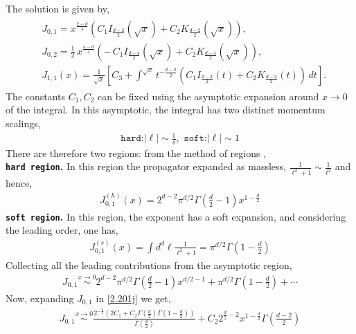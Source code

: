 The solution is given by,
\begin{align}
\begin{split}
&    J_{0,1}=x^{\frac{2-d}{4}}\left(C_1 I_{\frac{d-2}{2}}(\sqrt{x})+C_2 K_{\frac{d-2}{2}}(\sqrt{x})\right),\\ &
J_{0,2}
=
\frac{1}{2}\,x^{\frac{4-d}{4}}
\left(
-\,C_1 I_{\frac{d-4}{2}}(\sqrt{x})
+
C_2 K_{\frac{d-4}{2}}(\sqrt{x})
\right),\\ &
J_{1,1}(x)
=
\frac{1}{\sqrt{x}}
\left[
C_3
+
\int^{\sqrt{x}}
t^{-\frac{d-2}{2}}
\left(
C_1 I_{\frac{d-2}{2}}(t)
+
C_2 K_{\frac{d-2}{2}}(t)
\right)\,dt
\right].\label{2.201j}
    \end{split}
\end{align}
The constants $C_1, C_2$ can be fixed using the asymptotic expansion around $x\to 0$ of the integral. In this asymptotic, the integral has two distinct momentum scalings,
\begin{align}
   \texttt{hard:} |\boldsymbol{\ell}|\sim\frac{1}{s},\,\,  \texttt{soft:} |\boldsymbol{\ell}|\sim1
\end{align}
There are therefore two regions: from the method of regions \cite{Beneke:1997zp},\\
\textbf{\texttt{hard region}.} In this region the propagator expanded as massless, $\frac{1}{\boldsymbol{\ell}^2+1}\sim \frac{1}{\boldsymbol{\ell}^2}$ and hence,
\begin{align}
    J_{0,1}^{(h)}(x)=2^{d-2}\pi^{d/2} \Gamma\left(\frac{d}{2}-1\right)x^{1-\frac{d}{2}}
\end{align}
\textbf{\texttt{soft region}.} In this region, the exponent has a soft expansion, and considering the leading order, one has,
\begin{align}
    J_{0,1}^{(s)}(x)=\int d^d\boldsymbol{\ell} \frac{1}{\boldsymbol{\ell}^2+1}=\pi^{d/2}\Gamma\left(1-\frac{d}{2}\right)
\end{align}
Collecting all the leading contributions from the asymptotic region,
\begin{align}
    J_{0,1}\overset{x\to 0}{\sim} 2^{d-2}\pi^{d/2}\Gamma\left(\frac{d}{2}-1\right) x^{d/2-1}+\pi^{d/2}\Gamma\left(1-\frac{d}{2}\right)+\cdots\label{2.205a}
\end{align}
Now, expanding $J_{0,1}$ in \eqref{2.201j} we get,
\begin{align}
   J_{0,1}\overset{x\to 0}{\sim}  \frac{2^{-\frac{d}{2}} \left(2 C_1+C_2 \Gamma \left(\frac{d}{2}\right) \Gamma \left(1-\frac{d}{2}\right)\right)}{\Gamma \left(\frac{d}{2}\right)}+C_2 2^{\frac{d}{2}-2} x^{1-\frac{d}{2}} \Gamma \left(\frac{d-2}{2}\right)\label{2.206a}
\end{align}
